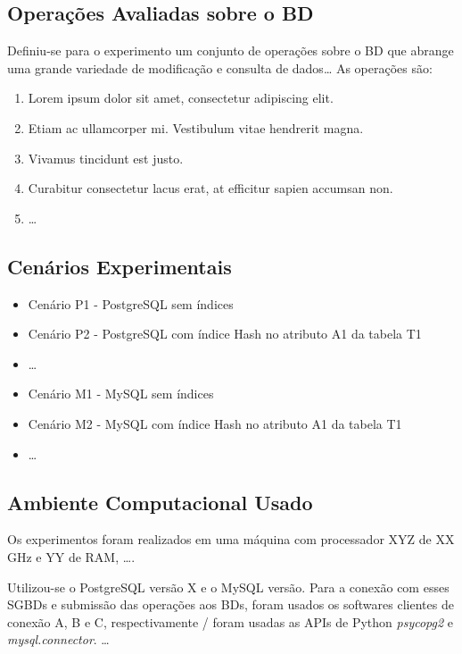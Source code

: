 \documentclass[12pt,a4paper]{article}
\begin{document}
\subsection{Operações Avaliadas sobre o BD}

Definiu-se para o experimento um conjunto de operações sobre o BD que abrange uma grande variedade de modificação e consulta de dados\dots  
As operações são:

\begin{enumerate}
    \item Lorem ipsum dolor sit amet, consectetur adipiscing elit.   
    \item Etiam ac ullamcorper mi. Vestibulum vitae hendrerit magna.   
    \item Vivamus tincidunt est justo.   
    \item Curabitur consectetur lacus erat, at efficitur sapien accumsan non.  
    \item \dots
\end{enumerate}
   
\subsection{Cenários Experimentais}

\begin{itemize}
    \item Cenário P1 - PostgreSQL sem índices  
    \item Cenário P2 - PostgreSQL com índice Hash no atributo A1 da tabela T1  
    \item \dots  
    \item Cenário M1 - MySQL sem índices  
    \item Cenário M2 - MySQL com índice Hash no atributo A1 da tabela T1  
    \item \dots
\end{itemize}

\subsection{Ambiente Computacional Usado}

Os experimentos foram realizados em uma máquina com processador XYZ de XX GHz e YY de RAM, \dots.

Utilizou-se o PostgreSQL versão X e o MySQL versão. Para a conexão com esses SGBDs e  submissão das operações aos BDs, foram usados os softwares clientes de conexão A, B e C, respectivamente / foram usadas as APIs de Python \textit{psycopg2} e \textit{mysql.connector}. \dots
\end{document}

